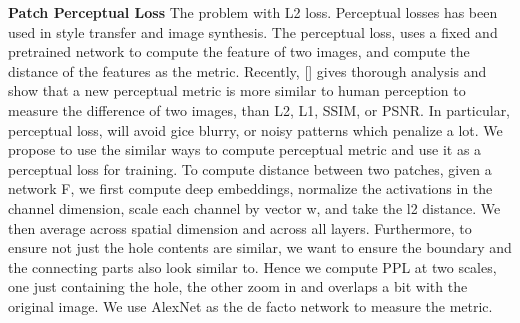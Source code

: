 \begin{table}[h!]
\begin{center}

  \end{center}
  \caption{Numerical comparison on 200 test images of ImageNet.}
  \vspace{-10pt}
  \label{table:numerical}
\end{table}

\noindent\textbf{Patch Perceptual Loss} The problem with L2 loss. Perceptual losses has been used in style transfer and image synthesis. The perceptual loss, uses a fixed and pretrained network to compute the feature of two images, and compute the distance of the features as the metric. Recently, [] gives thorough analysis and show that a new perceptual metric is more similar to human perception to measure the difference of two images, than L2, L1, SSIM, or PSNR. In particular, perceptual loss, will avoid gice blurry, or noisy patterns which penalize a lot. We propose to use the similar ways to compute perceptual metric and use it as a perceptual loss for training. To compute distance between two patches, given a network F, we first compute deep embeddings, normalize the activations in the channel dimension, scale each channel by vector w, and take the l2 distance. We then average across spatial dimension and across all layers. Furthermore, to ensure not just the hole contents are similar, we want to ensure the boundary and the connecting parts also look similar to. Hence we compute PPL at two scales, one just containing the hole, the other zoom in and overlaps a bit with the original image. We use AlexNet as the de facto network to measure the metric.

